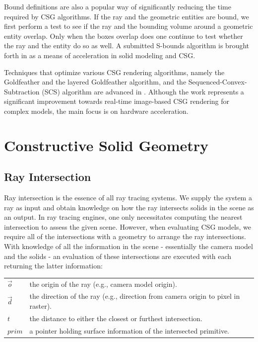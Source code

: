 \documentclass[a4paper,11pt,oneside]{article}
\makeatletter
\newenvironment{conditions}
  {\par\vspace{\abovedisplayskip}\noindent\begin{tabular}{>{$}l<{$} @{${}={}$} l}}
  {\end{tabular}\par\vspace{\belowdisplayskip}}
\makeatother
\begin{document}
Bound definitions are also a popular way of significantly reducing the time required by CSG algorithms. If the ray and the geometric entities are bound, we first perform a test to see if the ray and the bounding volume around a geometric entity overlap. Only when the boxes overlap does one continue to test whether the ray and the entity do so as well. A submitted S-bounds algorithm is brought forth in \cite{sbounds_csg} as a means of acceleration in solid modeling and CSG.
  
Techniques that optimize various CSG rendering algorithms, namely the Goldfeather and the layered Goldfeather algorithm, and the Sequenced-Convex- Subtraction (SCS) algorithm are advanced in \cite{hardware_accelerated_image_based_csg.}. Although the work represents a significant improvement towards real-time image-based CSG rendering for complex models,  the main focus is on hardware acceleration.
  

\section{Constructive Solid Geometry}
    
\subsection{Ray Intersection}
\label{section:ray-intersection}

Ray intersection is the essence of all ray tracing systems. We supply the system a ray as input and obtain knowledge on how the ray intersects solids in the scene as an output. In ray tracing engines, one only necessitates computing the nearest intersection to assess the given scene. However, when evaluating CSG models, we require all of the intersections with a geometry to arrange the ray intersections. With knowledge of all the information in the scene - essentially the camera model and the solids - an evaluation of these intersections are executed with each returning the latter information:

\begin{conditions}
	\vec{o}     & the origin of the ray (e.g., camera model origin). \\
	\vec{d}     & the direction of the ray (e.g., direction from camera origin to pixel in raster). \\
	t     &  the distance to either the closest or furthest intersection. \\
	prim    &  a pointer holding surface information of the intersected primitive. 
\end{conditions}
\end{document}
